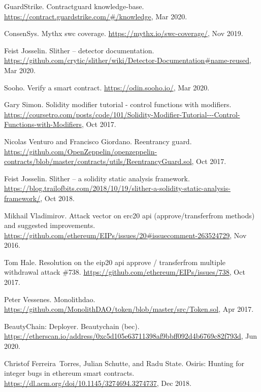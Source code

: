 \begin{thebibliography}{10}
GuardStrike.
\newblock Contractguard knowledge-base.
\newblock \url{https://contract.guardstrike.com/#/knowledge}, Mar 2020.

ConsenSys.
\newblock Mythx swc coverage.
\newblock \url{https://mythx.io/swc-coverage/}, Nov 2019.

Feist Josselin.
\newblock Slither -- detector documentation.
\newblock
  \url{https://github.com/crytic/slither/wiki/Detector-Documentation#name-reused},
  Mar 2020.

Sooho.
\newblock Verify a smart contract.
\newblock \url{https://odin.sooho.io/}, Mar 2020.

Gary Simon.
\newblock Solidity modifier tutorial - control functions with modifiers.
\newblock
  \url{https://coursetro.com/posts/code/101/Solidity-Modifier-Tutorial---Control-Functions-with-Modifiers},
  Oct 2017.

Nicolas Venturo and Francisco Giordano.
\newblock Reentrancy guard.
\newblock
  \url{https://github.com/OpenZeppelin/openzeppelin-contracts/blob/master/contracts/utils/ReentrancyGuard.sol},
  Oct 2017.

Feist Josselin.
\newblock Slither -- a solidity static analysis framework.
\newblock
  \url{https://blog.trailofbits.com/2018/10/19/slither-a-solidity-static-analysis-framework/},
  Oct 2018.

Mikhail Vladimirov.
\newblock Attack vector on erc20 api (approve/transferfrom methods) and
  suggested improvements.
\newblock
  \url{https://github.com/ethereum/EIPs/issues/20\#issuecomment-263524729}, Nov
  2016.

Tom Hale.
\newblock Resolution on the eip20 api approve / transferfrom multiple
  withdrawal attack \#738.
\newblock \url{https://github.com/ethereum/EIPs/issues/738}, Oct 2017.

Peter Vessenes.
\newblock Monolithdao.
\newblock \url{https://github.com/MonolithDAO/token/blob/master/src/Token.sol},
  Apr 2017.

BeautyChain: Deployer.
\newblock Beautychain (bec).
\newblock
  \url{https://etherscan.io/address/0xc5d105e63711398af9bbff092d4b6769c82f793d},
  Jun 2020.

Christof Ferreira~Torres, Julian Schutte, and Radu State.
\newblock Osiris: Hunting for integer bugs in ethereum smart contracts.
\newblock \url{https://dl.acm.org/doi/10.1145/3274694.3274737}, Dec 2018.


\end{thebibliography}
